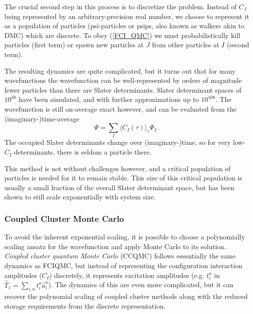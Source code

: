 \documentclass{article}
\theoremstyle{plain}\theoremheaderfont{\normalfont\itshape}\theorembodyfont{\rmfamily}\theoremseparator{.}\newtheorem*{rem}{Remark}\newtheorem*{ex}{Example}\newtheorem*{proof}{Proof}\newtheorem*{altp}{Alternative proof}
\theoremstyle{plain}\theoremheaderfont{\normalfont\bfseries}\theorembodyfont{\rmfamily}\theoremseparator{.}\newtheorem{thm}{Theorem}[section]\newtheorem{lem}[thm]{Lemma}\newtheorem{prop}[thm]{Proposition}\newtheorem*{cor}{Corollary}\newtheorem{defn}[thm]{Definition}\newtheorem{clm}[thm]{Claim}\newtheorem{clminproof}{Claim}
\theoremstyle{break}\theoremheaderfont{\normalfont\itshape}\theorembodyfont{\rmfamily}\theoremseparator{.\medskip}\newtheorem*{proofskip}{Proof}\newtheorem*{exs}{Examples}\newtheorem*{rems}{Remarks}
\theoremstyle{break}\theoremheaderfont{\normalfont\bfseries}\theorembodyfont{\rmfamily}\theoremseparator{.\medskip}\newtheorem{lemskip}[thm]{Lemma}\newtheorem{defnskip}[thm]{Definition}\newtheorem{propskip}[thm]{Proposition}\newtheorem{thmskip}[thm]{Theorem}
\numberwithin{equation}{section}
\begin{document}
    The crucial second step in this process is to discretize the problem. Instead of \(C_J\) being represented by an arbitrary-precision real number, we choose to represent it as a population of particles (psi-particles or psips, also known as walkers akin to DMC) which are discrete. To obey (\ref{FCI_QMC}) we must probabilistically kill particles (first term) or spawn new particles at \(J\) from other particles at \(I\) (second term).

    The resulting dynamics are quite complicated, but it turns out that for many wavefunctions the wavefunction can be well-represented by orders of magnitude fewer particles than there are Slater determinants. Slater determinant spaces of \(10^{38}\) have been simulated, and with further approximations up to \(10^{108}\). The wavefunction is still on-average exact however, and can be evaluated from the (imaginary-)time-average
    \begin{equation}
        \Psi=\sum_I\langle C_I(\tau)\rangle_\tau\Phi_I\,.
    \end{equation}
    The occupied Slater determinants change over (imaginary-)time, so for very low-\(C_I\) determinants, there is seldom a particle there.

    This method is not without challenges however, and a critical population of particles is needed for it to remain stable. This size of this critical population is usually a small fraction of the overall Slater determinant space, but has been shown to still scale exponentially with system size.

    \subsubsection{Coupled Cluster Monte Carlo}
    To avoid the inherent exponential scaling, it is possible to choose a polynomially scaling ansatz for the wavefunction and apply Monte Carlo to its solution. \textit{Coupled cluster quantum Monte Carlo} (CCQMC) follows essentially the same dynamics as FCIQMC, but instead of representing the configuration interaction amplitudes (\(C_I\)) discretely, it represents excitation amplitudes (e.g. \(t_i^a\) in \(\hat{T}_1=\sum_{i,a}t_i^a\hat{a}_i^a\)). The dynamics of this are even more complicated, but it can recover the polynomial scaling of coupled cluster methods along with the reduced storage requirements from the discrete representation.
\end{document}
